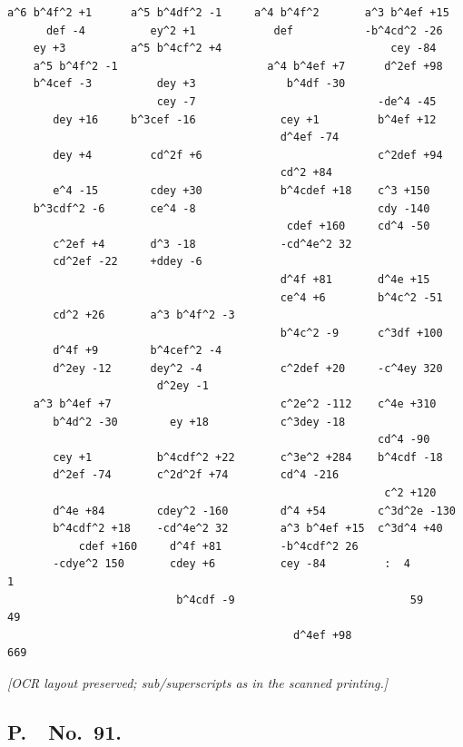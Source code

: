 \documentclass[11pt]{article}
\begin{document}
\begin{small}
\begin{verbatim}
a^6 b^4f^2 +1      a^5 b^4df^2 -1     a^4 b^4f^2       a^3 b^4ef +15
      def -4          ey^2 +1            def           -b^4cd^2 -26
    ey +3          a^5 b^4cf^2 +4                          cey -84
    a^5 b^4f^2 -1                       a^4 b^4ef +7      d^2ef +98
    b^4cef -3          dey +3              b^4df -30
                       cey -7                            -de^4 -45
       dey +16     b^3cef -16             cey +1         b^4ef +12
                                          d^4ef -74
       dey +4         cd^2f +6                           c^2def +94
                                          cd^2 +84
       e^4 -15        cdey +30            b^4cdef +18    c^3 +150
    b^3cdf^2 -6       ce^4 -8                            cdy -140
                                           cdef +160     cd^4 -50
       c^2ef +4       d^3 -18             -cd^4e^2 32
       cd^2ef -22     +ddey -6
                                          d^4f +81       d^4e +15
                                          ce^4 +6        b^4c^2 -51
       cd^2 +26       a^3 b^4f^2 -3
                                          b^4c^2 -9      c^3df +100
       d^4f +9        b^4cef^2 -4
       d^2ey -12      dey^2 -4            c^2def +20     -c^4ey 320
                       d^2ey -1
    a^3 b^4ef +7                          c^2e^2 -112    c^4e +310
       b^4d^2 -30        ey +18           c^3dey -18
                                                         cd^4 -90
       cey +1          b^4cdf^2 +22       c^3e^2 +284    b^4cdf -18
       d^2ef -74       c^2d^2f +74        cd^4 -216
                                                          c^2 +120
       d^4e +84        cdey^2 -160        d^4 +54        c^3d^2e -130
       b^4cdf^2 +18    -cd^4e^2 32        a^3 b^4ef +15  c^3d^4 +40
           cdef +160     d^4f +81         -b^4cdf^2 26
       -cdye^2 150       cdey +6          cey -84         :  4              1
                          b^4cdf -9                           59          49
                                            d^4ef +98                    669
\end{verbatim}
\end{small}

\textit{[OCR layout preserved; sub/superscripts as in the scanned printing.]}

\bigskip

\subsection*{P.\ \ No.\ 91.}
\end{document}
